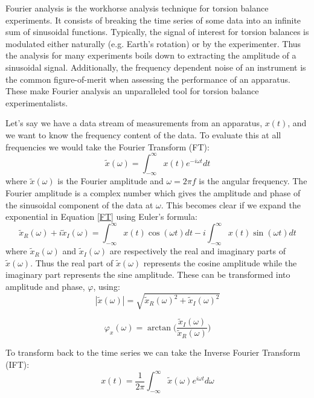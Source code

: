 \documentclass{book}
\begin{document}
\quad Fourier analysis is the workhorse analysis technique for torsion balance experiments. It consists of breaking the time series of some data into an infinite sum of sinusoidal functions. Typically, the signal of interest for torsion balances is modulated either naturally (e.g. Earth's rotation) or by the experimenter. Thus the analysis for many experiments boils down to extracting the amplitude of a sinusoidal signal. Additionally, the frequency dependent noise of an instrument is the common figure-of-merit when assessing the performance of an apparatus. These make Fourier analysis an unparalleled tool for torsion balance experimentalists.

Let's say we have a data stream of measurements from an apparatus, $x(t)$, and we want to know the frequency content of the data. To evaluate this at all frequencies we would take the Fourier Transform (FT):
\begin{equation}
\tilde x (\omega) = \int_{-\infty}^\infty x(t) e^{-i \omega t } dt \label{FT}
\end{equation}
where $\tilde x (\omega)$ is the Fourier amplitude and $\omega= 2\pi f$ is the angular frequency. The Fourier amplitude is a complex number which gives the amplitude and phase of the sinusoidal component of the data at $\omega$. This becomes clear if we expand the exponential in Equation \ref{FT} using Euler's formula:
\begin{equation}
\tilde x_R (\omega) +i \tilde x_I (\omega) = \int_{-\infty}^\infty x(t) \cos(\omega t) dt - i \int_{-\infty}^\infty x(t) \sin(\omega t) dt 
\end{equation}
where $\tilde x_R (\omega)$ and $\tilde x_I (\omega)$ are respectively the real and imaginary parts of $\tilde x (\omega)$. Thus the real part of $\tilde x (\omega)$ represents the cosine amplitude while the imaginary part represents the sine amplitude. These can be transformed into amplitude and phase, $\varphi$, using:
\begin{equation}
|\tilde x (\omega)|=\sqrt{\tilde x_R (\omega)^2 + \tilde x_I (\omega)^2}
\end{equation}

\begin{equation}
\varphi_x (\omega)=\arctan \bigg( \frac{\tilde x_I (\omega)}{\tilde x_R (\omega)} \bigg)
\end{equation}


To transform back to the time series we can take the Inverse Fourier Transform (IFT):
\begin{equation}
x(t) = \frac{1}{2\pi}\int_{-\infty}^\infty \tilde x (\omega) e^{i \omega t } d\omega \label{FT}
\end{equation}
\end{document}

